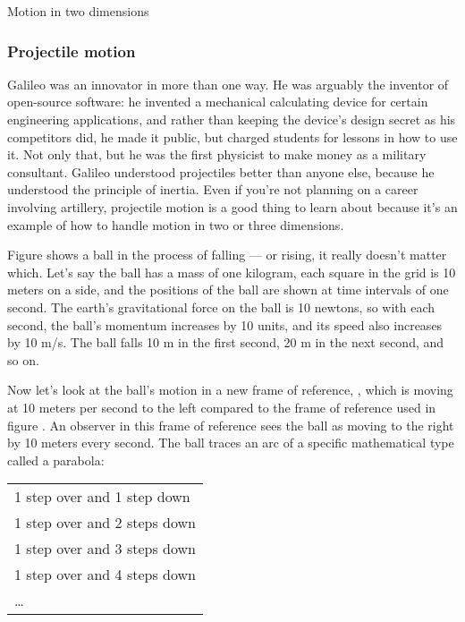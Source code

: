 \begin{envsubsection}{Motion in two dimensions}
\subsubsection{Projectile motion}
Galileo was an innovator in more than one way. He was arguably the inventor of open-source
software: he invented a mechanical calculating device for certain engineering applications,
and rather than keeping the device's design secret as his competitors did, he made it
public, but charged students for lessons in how to use it. Not only that, but he was
the first physicist to make money as a military consultant. Galileo understood projectiles
better than anyone else, because he understood the principle of inertia. Even if you're not
planning on a career involving artillery, projectile motion is a good thing to learn about
because it's an example of how to handle motion in two or three dimensions. 

Figure  shows a ball in the process of falling --- or rising,
it really doesn't matter which. Let's say the ball has a mass of one kilogram, each square in
the grid is 10 meters on a side, and the positions of the ball are shown at time intervals
of one second. The earth's gravitational force on the ball is 10 newtons, so with each
second, the ball's momentum increases by 10 units, and its speed also increases by
10 m/s. The ball falls 10 m in the first second, 20 m in the next second, and so on.


Now let's look at the ball's motion in a new frame of reference, ,
which is moving at 10 meters per second to the left compared to the frame of reference
used in figure . An observer in this frame of reference sees the ball
as moving to the right by 10 meters every second. The ball traces an arc of a specific
mathematical type called a parabola:

\hspace{15mm}\parbox{80mm}{\begin{tabular}{p{60mm}}
1 step over and 1 step down\\
1 step over and 2 steps down\\
1 step over and 3 steps down\\
1 step over and 4 steps down\\
\ldots
\end{tabular}}


\end{envsubsection}
